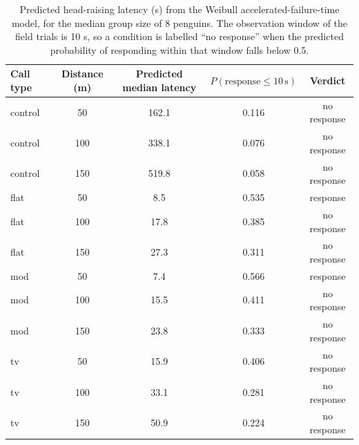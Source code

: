 \begin{table}[!ht]
\centering
\caption{Predicted head-raising latency (s) from the Weibull accelerated-failure-time
model, for the median group size of 8 penguins. The observation window of the field
trials is 10 s, so a condition is labelled ``no response'' when the predicted
probability of responding within that window falls below 0.5.}
\label{tab:latency}
\footnotesize
\begin{tabular}{lcccc}
\toprule
Call type & Distance (m) & Predicted median latency & $P(\text{response}\le 10\,\text{s})$ & Verdict\\
\midrule
control & 50 & 162.1 & 0.116 & no response\\
control & 100 & 338.1 & 0.076 & no response\\
control & 150 & 519.8 & 0.058 & no response\\
flat & 50 & 8.5 & 0.535 & response\\
flat & 100 & 17.8 & 0.385 & no response\\
flat & 150 & 27.3 & 0.311 & no response\\
mod & 50 & 7.4 & 0.566 & response\\
mod & 100 & 15.5 & 0.411 & no response\\
mod & 150 & 23.8 & 0.333 & no response\\
tv & 50 & 15.9 & 0.406 & no response\\
tv & 100 & 33.1 & 0.281 & no response\\
tv & 150 & 50.9 & 0.224 & no response\\
\bottomrule
\end{tabular}
\end{table}
